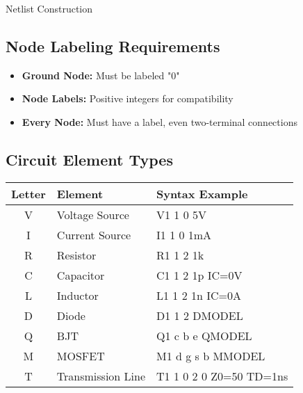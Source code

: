 \documentclass{beamer}
\begin{document}
\begin{frame}{Netlist Construction}
    \subsection{Node Labeling Requirements}
    \begin{itemize}
        \item \textbf{Ground Node:} Must be labeled "0"
        \item \textbf{Node Labels:} Positive integers for compatibility
        \item \textbf{Every Node:} Must have a label, even two-terminal connections
    \end{itemize}
    
    \subsection{Circuit Element Types}
    \begin{table}
        \centering
        \begin{tabular}{@{}cll@{}}
            \toprule
            Letter & Element & Syntax Example \\
            \midrule
            V & Voltage Source & V1 1 0 5V \\
            I & Current Source & I1 1 0 1mA \\
            R & Resistor & R1 1 2 1k \\
            C & Capacitor & C1 1 2 1p IC=0V \\
            L & Inductor & L1 1 2 1n IC=0A \\
            D & Diode & D1 1 2 DMODEL \\
            Q & BJT & Q1 c b e QMODEL \\
            M & MOSFET & M1 d g s b MMODEL \\
            T & Transmission Line & T1 1 0 2 0 Z0=50 TD=1ns \\
            \bottomrule
        \end{tabular}
    \end{table}
\end{frame}
\end{document}
